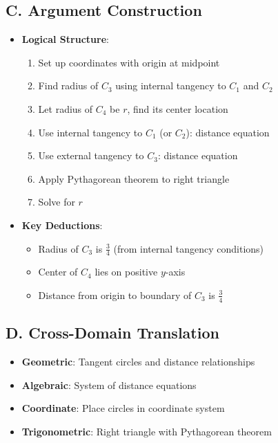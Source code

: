 \documentclass[11pt]{article}
\begin{document}
\begin{strategybox}
\subsection*{C. Argument Construction}
\begin{itemize}[leftmargin=*]
    \item \textbf{Logical Structure}:
    \begin{enumerate}
        \item Set up coordinates with origin at midpoint
        \item Find radius of $C_3$ using internal tangency to $C_1$ and $C_2$
        \item Let radius of $C_4$ be $r$, find its center location
        \item Use internal tangency to $C_1$ (or $C_2$): distance equation
        \item Use external tangency to $C_3$: distance equation
        \item Apply Pythagorean theorem to right triangle
        \item Solve for $r$
    \end{enumerate}
    \item \textbf{Key Deductions}:
    \begin{itemize}
        \item Radius of $C_3$ is $\frac{3}{4}$ (from internal tangency conditions)
        \item Center of $C_4$ lies on positive $y$-axis
        \item Distance from origin to boundary of $C_3$ is $\frac{3}{4}$
    \end{itemize}
\end{itemize}

\subsection*{D. Cross-Domain Translation}
\begin{itemize}[leftmargin=*]
    \item \textbf{Geometric}: Tangent circles and distance relationships
    \item \textbf{Algebraic}: System of distance equations
    \item \textbf{Coordinate}: Place circles in coordinate system
    \item \textbf{Trigonometric}: Right triangle with Pythagorean theorem
\end{itemize}
\end{strategybox}
\end{document}
